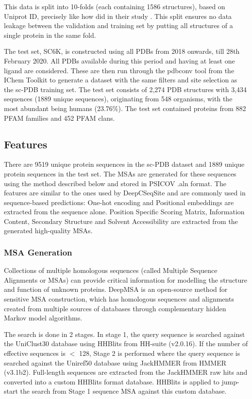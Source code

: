 \documentclass[journal=jacsat,manuscript=article]{achemso}
\begin{document}
This data is split into 10-folds (each containing 1586 structures), based on Uniprot ID, precisely like how \citeauthor{stepniewska2020improving} did in their study \cite{stepniewska2020improving}. This split ensures no data leakage between the validation and training set by putting all structures of a single protein in the same fold.

The test set, SC6K, is constructed using all PDBs from 2018 onwards, till 28th February 2020. All PDBs available during this period and having at least one ligand are considered. These are then run through the pdbconv tool from the IChem Toolkit \cite{da2018ichem} to generate a dataset with the same filters and site selection as the sc-PDB\cite{desaphy2015sc} training set. The test set consists of 2,274 PDB structures with 3,434 sequences (1889 unique sequences), originating from 548 organisms, with the most abundant being humans (23.76\%). The test set contained proteins from 882 PFAM families and 452 PFAM clans.

\subsection{Features}
\quad There are 9519 unique protein sequences in the sc-PDB\cite{desaphy2015sc} dataset and 1889 unique protein sequences in the test set. The MSAs are generated for these sequences using the method described below and stored in PSICOV \cite{jones2012psicov} .aln format. The features are similar to the ones used by DeepCSeqSite\cite{cui2019predicting} and are commonly used in sequence-based predictions: One-hot encoding and Positional embeddings are extracted from the sequence alone. Position Specific Scoring Matrix, Information Content, Secondary Structure and Solvent Accessibility are extracted from the generated high-quality MSAs.

\subsubsection{MSA Generation}
\quad Collections of multiple homologous sequences (called Multiple Sequence Alignments or MSAs) can provide critical information for modelling the structure and function of unknown proteins. DeepMSA \cite{zhang2020deepmsa} is an open-source method for sensitive MSA construction, which has homologous sequences and alignments created from multiple sources of databases through complementary hidden Markov model algorithms.

The search is done in 2 stages. In stage 1, the query sequence is searched against the UniClust30 \cite{mirdita2017uniclust} database using HHBlits from HH-suite\cite{remmert2012hhblits} (v2.0.16). If the number of effective sequences is $<$ 128, Stage 2 is performed where the query sequence is searched against the Uniref50 \cite{suzek2015uniref} database using JackHMMER from HMMER \cite{johnson2010hidden} (v3.1b2). Full-length sequences are extracted from the JackHMMER raw hits and converted into a custom HHBlits format database. HHBlits is applied to jump-start the search from Stage 1 sequence MSA against this custom database.
\end{document}
